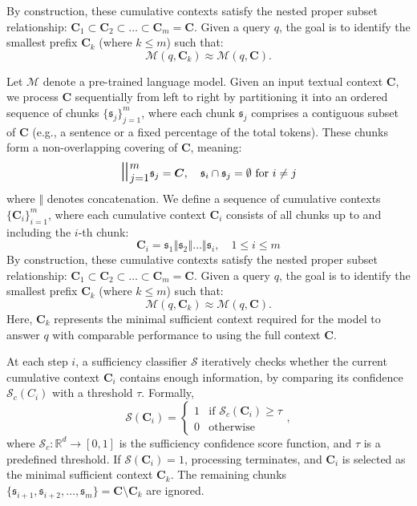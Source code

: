 By construction, these cumulative contexts satisfy the nested proper subset relationship: $\mathbf{C}_1 \subset \mathbf{C}_2 \subset \dots \subset \mathbf{C}_m = \mathbf{C}.$ Given a query \(q\), the goal is to identify the smallest prefix \(\mathbf{C}_k\) (where \(k \leq m\)) such that:
\[
\mathcal{M}(q, \mathbf{C}_k) \approx \mathcal{M}(q, \mathbf{C}).
\]


Let \(\mathcal{M}\) denote a pre-trained language model. Given an input textual context \(\mathbf{C}\), we process \(\mathbf{C}\) sequentially from left to right by partitioning it into an ordered sequence of chunks \(\{\mathfrak{s}_j\}_{j=1}^m\), where each chunk \(\mathfrak{s}_j\) comprises a contiguous subset of \(\mathbf{C}\) (e.g., a sentence or a fixed percentage of the total tokens). These chunks form a non-overlapping covering of \(\mathbf{C}\), meaning:
\[
\mathlarger{\mathlarger{\mathlarger{\mathbin\Vert}}}_{j=1}^{m} \mathfrak{s}_j = \mathbf{C}, \quad \mathfrak{s}_i \cap \mathfrak{s}_j = \emptyset \text{ for } i \neq j
\]
where \(\mathbin\Vert\) denotes concatenation. We define a sequence of cumulative contexts \(\{\mathbf{C}_i\}_{i=1}^m\), where each cumulative context \(\mathbf{C}_i\) consists of all chunks up to and including the \(i\)-th chunk: 
\[
\mathbf{C}_i = \mathfrak{s}_1 \mathbin\Vert \mathfrak{s}_2 \mathbin\Vert \dots \mathbin\Vert \mathfrak{s}_i, \quad 1 \leq i \leq m
\]
By construction, these cumulative contexts satisfy the nested proper subset relationship: $\mathbf{C}_1 \subset \mathbf{C}_2 \subset \dots \subset \mathbf{C}_m = \mathbf{C}.$ Given a query \(q\), the goal is to identify the smallest prefix \(\mathbf{C}_k\) (where \(k \leq m\)) such that:
\[
\mathcal{M}(q, \mathbf{C}_k) \approx \mathcal{M}(q, \mathbf{C}).
\]
Here, \(\mathbf{C}_k\) represents the minimal sufficient context required for the model to answer \(q\) with comparable performance to using the full context \(\mathbf{C}\).

At each step \(i\), a sufficiency classifier \(\mathcal{S}\) iteratively checks whether the current cumulative context \(\mathbf{C}_i\) contains enough information, by comparing its confidence \(\mathcal{S}_c(C_i)\) with a threshold \(\tau\). Formally,
\[
\mathcal{S}(\mathbf{C}_i) = 
\begin{cases} 
1 & \text{if } \mathcal{S}_c(\mathbf{C}_i) \geq \tau  \\
0 & \text{otherwise}
\end{cases},
\]
where \(\mathcal{S}_c: \mathbb{R}^d \rightarrow [0,1]\) is the sufficiency confidence score function, and \(\tau\) is a predefined threshold. If \(\mathcal{S}(\mathbf{C}_i) = 1\), processing terminates, and \(\mathbf{C}_i\) is selected as the minimal sufficient context \(\mathbf{C}_k\). The remaining chunks \(\{\mathfrak{s}_{i+1}, \mathfrak{s}_{i+2}, \ldots, \mathfrak{s}_m\} = \mathbf{C} \setminus \mathbf{C}_k\) are ignored. 

